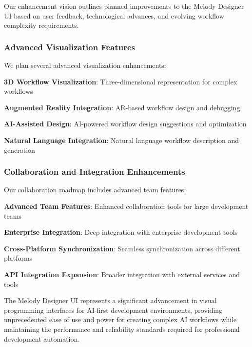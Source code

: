 Our enhancement vision outlines planned improvements to the Melody Designer UI based on user feedback, technological advances, and evolving workflow complexity requirements.

\subsubsection*{Advanced Visualization Features}

We plan several advanced visualization enhancements:

\begin{compactlist}
    \item \textbf{3D Workflow Visualization}: Three-dimensional representation for complex workflows
    \item \textbf{Augmented Reality Integration}: AR-based workflow design and debugging
    \item \textbf{AI-Assisted Design}: AI-powered workflow design suggestions and optimization
    \item \textbf{Natural Language Integration}: Natural language workflow description and generation
\end{compactlist}

\subsubsection*{Collaboration and Integration Enhancements}

Our collaboration roadmap includes advanced team features:

\begin{expandedlist}
    \item \textbf{Advanced Team Features}: Enhanced collaboration tools for large development teams
    \item \textbf{Enterprise Integration}: Deep integration with enterprise development tools
    \item \textbf{Cross-Platform Synchronization}: Seamless synchronization across different platforms
    \item \textbf{API Integration Expansion}: Broader integration with external services and tools
\end{expandedlist}

The Melody Designer UI represents a significant advancement in visual programming interfaces for AI-first development environments, providing unprecedented ease of use and power for creating complex AI workflows while maintaining the performance and reliability standards required for professional development automation.
